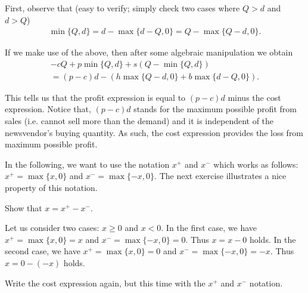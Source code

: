 \begin{solution}
First, observe that (easy to verify; simply check two cases where $Q>d$ and $d>Q$)
\begin{align*}
\min\{Q,d\} = d-\max\{d-Q,0\} = Q-\max\{Q-d,0\}.
\end{align*}

If we make use of the above, then after some algebraic manipulation we obtain 
\begin{align*}
 -cQ + p\min\{Q,d\} + s(Q-\min\{Q,d\}) \\
 = (p-c)d - \left(h\max\{Q-d,0\} + b\max\{d-Q,0\}\right).
\end{align*}

This tells us that the profit expression is equal to $(p-c)d$ minus the cost expression. Notice that, $(p-c)d$ stands for the maximum possible profit from sales (i.e. cannot sell more than the demand) and it is independent of the newsvendor's buying quantity. As such, the cost expression provides the loss from maximum possible profit.
\end{solution}

In the following, we want to use the notation $x^+$ and $x^-$ which works as follows: $x^+=\max\{x,0\}$ and $x^-=\max\{-x,0\}$. The next exercise illustrates a nice property of this notation.

\begin{question}
Show that $x=x^+-x^-$.
\end{question}

\begin{solution}
Let us consider two cases: $x\geq 0$ and $x<0$. In the first case, we have $x^+=\max\{x,0\}=x$ and $x^-=\max\{-x,0\}=0$. Thus $x=x-0$ holds. In the second case, we have $x^+=\max\{x,0\}=0$ and $x^-=\max\{-x,0\}=-x$. Thus $x=0-(-x)$ holds.
\end{solution}

\begin{question}
Write the cost expression again, but this time with the $x^+$ and $x^-$ notation.
\end{question}

